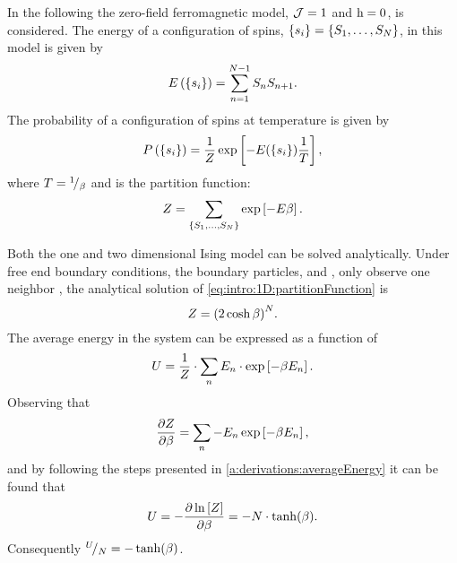 	In the following the zero-field ferromagnetic model, \ie \mbox{$\mathcal{J} = 1$} and \mbox{$\mathrm{h} = 0$},  is considered. The energy \energy of a configuration of spins, \mbox{$\left\{s_{i}\right\} = \left\{S_{1}, \dotsc, S_{N} \right\}$}, in this model is given by 
	\begin{equation*}
		E\left(\left\{s_{i}\right\}\right) = \sum_{n = 1}^{N - 1}S_{n}S_{n+1}.
	\end{equation*}
	The probability of a configuration of spins  at temperature \temperature is given by
	\begin{equation*}
		P\left(\left\{s_{i}\right\}\right) = 
		\frac{1}{Z} \exp\left[-{E(\left\{s_{i}\right\})}\frac{1}{T}\right],
	\end{equation*}
	where $T = {}^{1}\!/_{\beta}$ and \partitionfunction is the partition function:
	\begin{equation}
		\label{eq:intro:1D:partitionFunction}
		Z = \sum_{\left\{S_{1}, \dotsc, S_{N} \right\}} \exp\left[- E \beta \right].
	\end{equation}

	Both the one and two dimensional Ising model can be solved analytically. Under free end boundary conditions, \ie the boundary particles,  and , only observe one neighbor \cite{landau2014guide}, the analytical solution of \cref{eq:intro:1D:partitionFunction} is
	\begin{equation}
		\label{eq:introduced1D:partitionFunctionAnalyticalSolution}
		Z = {(2 \cosh \beta)}^N.
	\end{equation}
	The average energy in the system can be expressed as a function of \partitionfunction \cite{Murray20011Handout}
	\begin{equation*}
		U = \frac{1}{Z} \cdot \sum_{n} E_n \cdot \exp\left[-\beta E_n \right].		
	\end{equation*} 
	Observing that
	\begin{equation*}
		\frac{\partial Z}{\partial \beta} = \sum_{n} - E_n \exp\left[-\beta E_n \right],
	\end{equation*}
	and by following the steps presented in \cref{a:derivations:averageEnergy} it can be found that
	\begin{equation*}
		U = - \frac{\partial \ln \left[ Z \right]}{\partial \beta} = - N \cdot \tanh (\beta).
	\end{equation*}
	Consequently ${}^{U}\!/_{N} = - \tanh (\beta)$.


